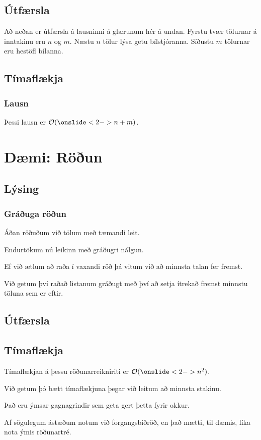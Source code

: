 \subsection{Útfærsla}
{
    {
        \item<1-> Að neðan er útfærsla á lausninni á glærunum hér á undan. Fyrstu tvær tölurnar á inntakinu eru $n$ og $m$. 
            Næstu $n$ tölur lýsa getu bílstjóranna.
            Síðustu $m$ tölurnar eru hestöfl bílanna.
        \item<2->[] 
    }
}

\subsection{Tímaflækja}
{
    \frametitle{Lausn}
    {
        \item<1-> Þessi lausn er $\mathcal{O}(\onslide<2->{n + m})$.
    }
}

\section{Dæmi: Röðun}
\subsection{Lýsing}
{
    \frametitle{Gráðuga röðun}
    {
        \item<1-> Áðan röðuðum við tölum með tæmandi leit.
        \item<2-> Endurtökum nú leikinn með gráðugri nálgun.
        \item<3-> Ef við ætlum að raða í vaxandi röð þá vitum við að minnsta talan fer fremst.
        \item<4-> Við getum því raðað listanum gráðugt með því að setja ítrekað fremst minnstu töluna sem er eftir.
    }
}

\subsection{Útfærsla}
{
}

\subsection{Tímaflækja}
{
    {
        \item<1-> Tímaflækjan á þessu röðunarreikniriti er $\mathcal{O}(\onslide<2->{n^2})$.
        \item<3-> Við getum þó bætt tímaflækjuna þegar við leitum að minnsta stakinu.
        \item<4-> Það eru ýmsar gagnagrindir sem geta gert þetta fyrir okkur.
        \item<5-> Af sögulegum ástæðum notum við forgangsbiðröð, en það mætti, til dæmis, líka nota ýmis röðunartré.
    }
}


